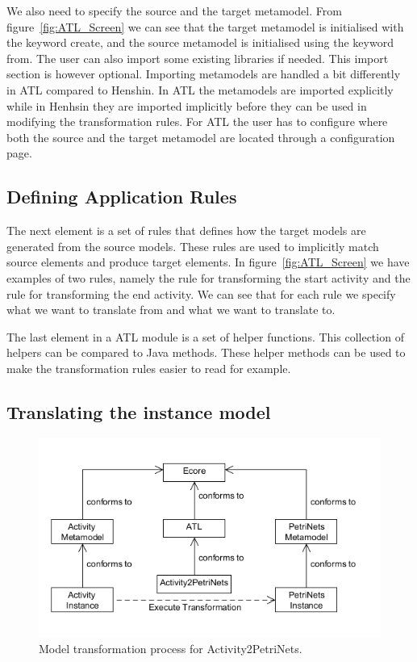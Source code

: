\documentclass[pdftex,11pt,a4paper]{article}
\begin{document}
We also need to specify the source and the target metamodel. From
figure~\ref{fig:ATL_Screen} we can see that the target metamodel is initialised 
with the keyword create, and the source metamodel is initialised using the
keyword from. The user can also import some existing libraries if needed. This
import section is however optional. Importing metamodels are handled a bit
differently in ATL compared to Henshin. In ATL the metamodels are imported
explicitly while in Henhsin they are imported implicitly before they can be used
in modifying the transformation rules. For ATL the user has to configure where
both the source and the target metamodel are located through a configuration
page. 

\subsection{Defining Application Rules}

The next element is a set of rules that defines how the target models are
generated from the source models. These rules are used to implicitly match
source elements and produce target elements. In figure~\ref{fig:ATL_Screen} we
have examples of two rules, namely the rule for transforming the start activity
and the rule for transforming the end activity. We can see that for each rule we
specify what we want to translate from and what we want to translate to. 

The last element in a ATL module is a set of helper functions. This collection
of helpers can be compared to Java methods. These helper methods can be used to
make the transformation rules easier to read for example.

\subsection{Translating the instance model}

\begin{figure}[H]
	\centering
	\includegraphics[scale=0.5]{figures/ATL.png}
	\caption{Model transformation process for Activity2PetriNets.}
	\label{fig:ATL}
\end{figure}
\end{document}
